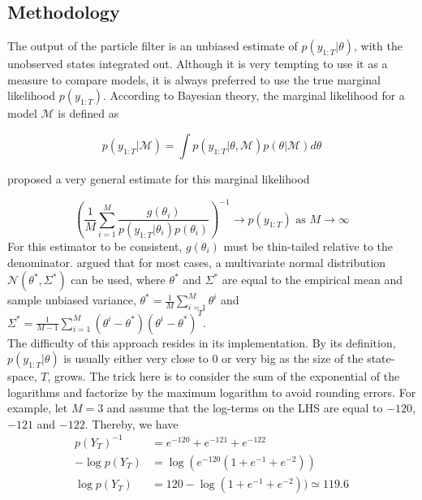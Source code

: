 \documentclass[11pt,a4,twosided,singlespacing,titlepagenumber=on]{scrreprt}
\numberwithin{equation}{chapter} %
\theoremstyle{remark}
\begin{document}
\subsection{Methodology}

The output of the particle filter is an unbiased estimate of $p(y_{1:T}|\theta)$, with the unobserved states integrated out. Although it is very tempting to use it as a measure to compare models, it is always preferred to use the true marginal likelihood $p(y_{1:T})$. According to Bayesian theory, the marginal likelihood for a model $\mathcal{M}$ is defined as

\begin{equation}
p(y_{1:T} | \mathcal{M}) = \int p(y_{1:T} | \theta, \mathcal{M}) p(\theta | \mathcal{M}) d\theta
\end{equation}


\cite{gelfand1994} proposed a very general estimate for this marginal likelihood

\begin{equation}
\left(\frac{1}{M} \sum_{i=1}^M \frac{g(\theta_i)}{p(y_{1:T} | \theta_i) p(\theta_i)}\right)^{-1} \rightarrow p(y_{1:T}) \text{ as } M \rightarrow \infty
\end{equation}
For this estimator to be consistent, $g(\theta_i)$ must be thin-tailed relative to the denominator. \cite{gelfand1994} argued that for most cases, a multivariate normal distribution $\mathcal{N}(\theta^*, \Sigma^*)$ can be used, where $\theta^*$ and $\Sigma^*$ are equal to the empirical mean and sample unbiased variance, $\theta^* = \frac{1}{M} \sum_{i=1}^M \theta^i$ and $\Sigma^* = \frac{1}{M-1} \sum_{i=1}^M \left(\theta^i - \theta^*\right)\left(\theta^i - \theta^*\right)^T$. \\


The difficulty of this approach resides in its implementation. By its definition, $p(y_{1:T} | \theta)$ is usually either very close to 0 or very big as the size of the state-space, $T$, grows. The trick here is to consider the sum of the exponential of the logarithms and factorize by the maximum logarithm to avoid rounding errors. For example, let $M = 3$ and assume that the log-terms on the LHS are equal to $-120$, $-121$ and $-122$. Thereby, we have
\begin{align*}
p(Y_T)^{-1} &= e^{-120} + e^{-121} + e^{-122} \\
- \log p(Y_T) &= \log (e^{-120} ( 1 + e^{-1} + e^{-2})) \\
 \log p(Y_T) &= 120 - \log ( 1 + e^{-1} + e^{-2})) \simeq 119.6
\end{align*}
\end{document}
